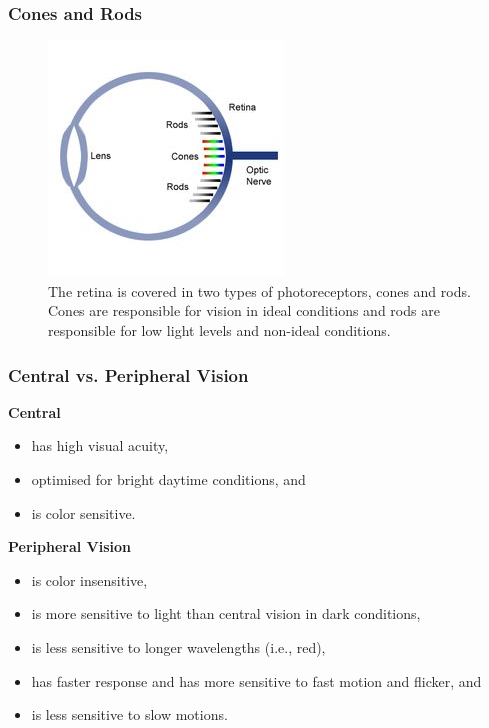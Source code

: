 \begin{frame}
	\frametitle{Cones and Rods}
	\begin{figure}
		\includegraphics[scale=.5]{assets/cones-rods.jpg}
		\caption{ The retina is covered in two types of photoreceptors, cones and rods. Cones are responsible for vision in ideal conditions and rods are responsible for low light levels and non-ideal conditions. }
	\end{figure}
\end{frame}


\begin{frame}
	\frametitle{Central vs. Peripheral Vision}
	\textbf{Central}
	\begin{itemize}
		\item has high visual acuity,
		\item optimised for bright daytime conditions, and
		\item is color sensitive.
	\end{itemize}
	
	\textbf{Peripheral Vision}
	\begin{itemize}
		\item is color insensitive, 
		\item is more sensitive to light than central vision in dark conditions,
		\item is less sensitive to longer wavelengths (i.e., red),
		\item has faster response and has more sensitive to fast motion and flicker, and
		\item is less sensitive to slow motions.
	\end{itemize}
\end{frame}

